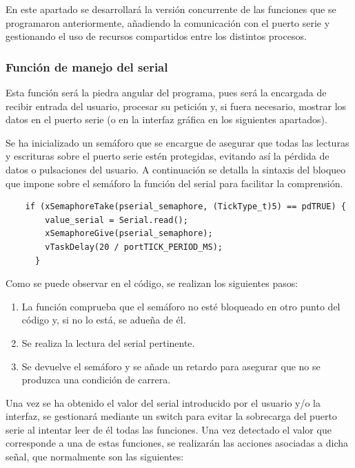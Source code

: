 En este apartado se desarrollará la versión concurrente de las funciones que se programaron anteriormente, añadiendo la comunicación con el puerto serie y gestionando el uso de recursos compartidos entre los distintos procesos. 


\subsubsection{Función de manejo del serial}

Esta función será la piedra angular del programa, pues será la encargada de recibir entrada del usuario, procesar su petición y, si fuera necesario, mostrar los datos en el puerto serie (o en la interfaz gráfica en los siguientes apartados).

Se ha inicializado un semáforo que se encargue de asegurar que todas las lecturas y escrituras sobre el puerto serie estén protegidas, evitando así la pérdida de datos o pulsaciones del usuario. A continuación se detalla la sintaxis del bloqueo que impone sobre el semáforo la función del serial para facilitar la comprensión.

\begin{verbatim}
    if (xSemaphoreTake(pserial_semaphore, (TickType_t)5) == pdTRUE) {
        value_serial = Serial.read();
        xSemaphoreGive(pserial_semaphore);
        vTaskDelay(20 / portTICK_PERIOD_MS);
      }  
\end{verbatim}

Como se puede observar en el código, se realizan los siguientes pasos:

\begin{enumerate}
    \item La función comprueba que el semáforo no esté bloqueado en otro punto del código y, si no lo está, se adueña de él.
    \item Se realiza la lectura del serial pertinente.
    \item Se devuelve el semáforo y se añade un retardo para asegurar que no se produzca una condición de carrera. 
\end{enumerate}

Una vez se ha obtenido el valor del serial introducido por el usuario y/o la interfaz, se gestionará mediante un switch para evitar la sobrecarga del puerto serie al intentar leer de él todas las funciones. Una vez detectado el valor que corresponde a una de estas funciones, se realizarán las acciones asociadas a dicha señal, que normalmente son las siguientes:

